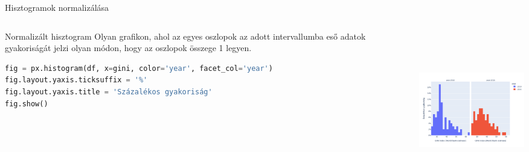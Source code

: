 \documentclass[english, aspectratio=169]{beamer}
\begin{document}
\begin{frame}[fragile]{Hisztogramok normalizálása}
	\begin{columns}
		\begin{column}{.5\textwidth}
			\begin{block}{Normalizált hisztogram}
				Olyan grafikon, ahol az egyes oszlopok az adott intervallumba eső adatok gyakoriságát jelzi olyan módon, hogy az oszlopok összege 1 legyen. 
			\end{block}
			\begin{lstlisting}[language=python]
fig = px.histogram(df, x=gini, color='year', facet_col='year')
fig.layout.yaxis.ticksuffix = '%'
fig.layout.yaxis.title = 'Százalékos gyakoriság'
fig.show()
			\end{lstlisting}
		\end{column}
		\begin{column}{.5\textwidth}
			\begin{center}
				\includegraphics[width=7cm, height=7cm, keepaspectratio]{images/freq_8.png}
			\end{center}
		\end{column}
	\end{columns}
\end{frame}
\end{document}
